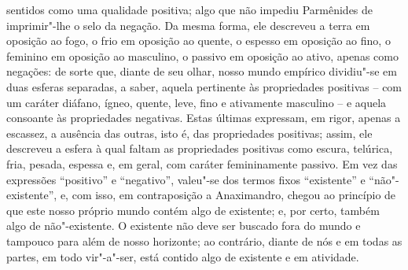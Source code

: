 sentidos como uma qualidade positiva; algo que não impediu
Parmênides de imprimir"-lhe o selo da negação. Da mesma forma, ele
descreveu a terra em oposição ao fogo, o frio em oposição ao quente, o
espesso em oposição ao fino, o feminino em oposição ao masculino, o
passivo em oposição ao ativo, apenas como negações: de sorte que,
diante de seu olhar, nosso mundo empírico dividiu"-se em duas esferas
separadas, a saber, aquela pertinente às propriedades positivas -- com um
caráter diáfano, ígneo, quente, leve, fino e ativamente masculino -- e
aquela consoante às propriedades negativas. Estas últimas expressam, em
rigor, apenas a escassez, a ausência das outras, isto é, das
propriedades positivas; assim, ele descreveu a esfera à qual faltam as
propriedades positivas como escura, telúrica, fria, pesada, espessa e,
em geral, com caráter femininamente passivo. Em vez das expressões
``positivo'' e ``negativo'', valeu"-se dos termos fixos ``existente'' e
``não"-existente'', e, com isso, em contraposição a Anaximandro, chegou ao
princípio de que este nosso próprio mundo contém algo de existente; e,
por certo, também algo de não"-existente. O existente não deve ser
buscado fora do mundo e tampouco para além de nosso horizonte; 
ao contrário, diante de nós e em todas as partes, 
em todo vir"-a"-ser, está contido algo de existente e em atividade.

